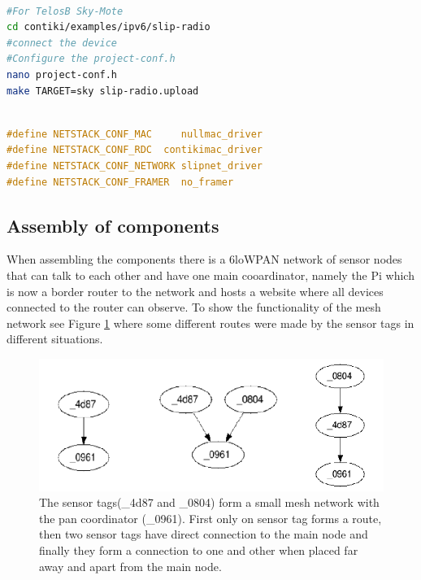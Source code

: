 \begin{lstlisting}[basicstyle=\small,language=bash,caption={Setting for the TelosB mote}]

#For TelosB Sky-Mote
cd contiki/examples/ipv6/slip-radio
#connect the device
#Configure the project-conf.h
nano project-conf.h
make TARGET=sky slip-radio.upload
\end{lstlisting}

\begin{lstlisting}[basicstyle=\small,language=c,caption={Setting for the TelosB mote}]

#define NETSTACK_CONF_MAC     nullmac_driver
#define NETSTACK_CONF_RDC  contikimac_driver
#define NETSTACK_CONF_NETWORK slipnet_driver
#define NETSTACK_CONF_FRAMER  no_framer
\end{lstlisting}

\subsection{Assembly of components}

When assembling the components there is a 6loWPAN network of sensor nodes that can talk to each other and have one main cooardinator, namely the Pi which is now a border router to the network and hosts a website where all devices connected to the router can observe. To show the functionality of the mesh network see Figure \ref{fig:Mesh} where some different routes were made by the sensor tags in different situations.

\begin{figure}[!h]
	\begin{center} 	
		\includegraphics[width=0.9\linewidth]{mesh}
		\caption{The sensor tags(\_4d87 and \_0804) form a small mesh network with the pan coordinator (\_0961). First only on sensor tag forms a route, then two sensor tags have direct connection to the main node and finally they form a connection to one and other when placed far away and apart from the main node.}
		\label{fig:Mesh}
	\end{center}
\end{figure} 
